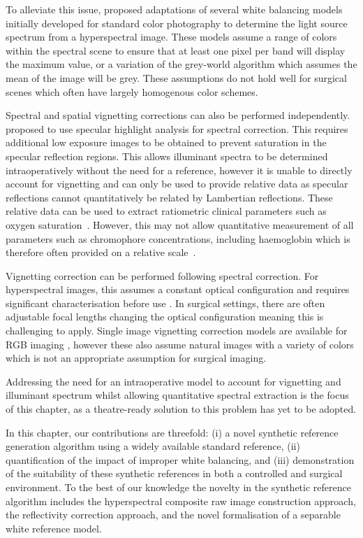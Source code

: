 %
To alleviate this issue, \cite{Khan2017} proposed adaptations of several white balancing models initially developed for standard color photography to determine the light source spectrum from a hyperspectral image.
These models assume a range of colors within the spectral scene to ensure that at least one pixel per band will display the maximum value, or a variation of the grey-world algorithm which assumes the mean of the image will be grey.
These assumptions do not hold well for surgical scenes which often have largely homogenous color schemes.

Spectral and spatial vignetting corrections can also be performed independently. \cite{Ayala2020} proposed to use
specular highlight analysis for spectral correction.
This requires additional low exposure images to be obtained to prevent saturation in the specular reflection regions.
This allows illuminant spectra to be determined intraoperatively without the need for a reference, however it is unable to directly account for vignetting and can only be used to provide relative data as specular reflections cannot quantitatively be related by Lambertian reflections.
%
These relative data can be used to extract ratiometric clinical parameters such as oxygen saturation~\cite{Giannoni2018,MacKenzie2018}.
However, this may not allow quantitative measurement of all parameters such as chromophore concentrations, including haemoglobin which is therefore often provided on a relative scale~\cite{Kulcke2018}.

Vignetting correction can be performed following spectral correction. For hyperspectral images, this assumes a constant optical configuration and requires significant characterisation before use \cite{Jiang2019}. In surgical settings, there are often adjustable focal lengths changing the optical configuration meaning this is challenging to apply. Single image vignetting correction models are available for RGB imaging \cite{Cho2014}, however these also assume natural images with a variety of colors which is not an appropriate assumption for surgical imaging.

Addressing the need for an intraoperative model to account for vignetting and illuminant spectrum whilst allowing quantitative spectral extraction is the focus of this chapter, as a theatre-ready solution to this problem has yet to be adopted. 

In this chapter, our contributions are threefold: (i) a novel synthetic reference generation algorithm using a widely available standard reference, (ii) quantification of the impact of improper white balancing, and (iii) demonstration of the suitability of these synthetic references in both a controlled and surgical environment. To the best of our knowledge the novelty in the synthetic reference algorithm includes the hyperspectral composite raw image construction approach, the reflectivity correction approach, and the novel formalisation of a separable white reference model. 


